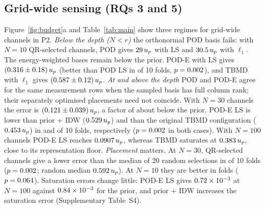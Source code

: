 \subsection{Grid-wide sensing (RQs 3 and 5)}
\label{sec:res_grid}
Figure~\ref{fig:budget}a and Table~\ref{tab:main} show three regimes for grid-wide channels in P2.
\emph{Below the depth ($N<r$)} the orthonormal POD basis fails: with $N=10$ QR-selected channels, POD gives $29\,u_p$ with LS and $30.5\,u_p$ with $\ell_1$. The energy-weighted bases remain below the prior. POD-E with LS gives $(0.316\pm0.18)\,u_p$ (better than POD LS in \WPTwoPodELsVsPodLsGridTenWins{} of 10 folds, $p=0.002$), and TBMD with $\ell_1$ gives $(0.587\pm0.12)\,u_p$.
\emph{At and above the depth} POD and POD-E agree for the same measurement rows when the sampled basis has full column rank; their separately optimised placements need not coincide. With $N=30$ channels the error is $(0.121\pm0.039)\,u_p$, a factor of about \PTwoGainPriorGridThirty{} below the prior. POD-E LS is lower than prior + IDW ($0.529\,u_p$) and than the original TBMD configuration ($0.453\,u_p$) in \WPTwoQrPodELsVsIdwGridThirtyWins{} and \WPTwoQrPodELsVsQrTbmdLGridThirtyWins{} of 10 folds, respectively ($p=0.002$ in both cases). With $N=100$ channels POD-E LS reaches $0.0907\,u_p$, whereas TBMD saturates at $0.383\,u_p$, close to its representation floor.
\emph{Placement} matters. At $N=30$, QR-selected channels give a lower error than the median of 20 random selections in \WPTwoQrPodELsVsRandomMedianGridThirtyWins{} of 10 folds ($p=0.002$; random median $0.592\,u_p$). At $N=10$ they are better in \WPTwoQrPodELsVsRandomMedianGridTenWins{} folds ($p=0.064$).
Saturation errors change little: POD-E LS gives $0.72\times10^{-3}$ at $N=100$ against $0.84\times10^{-3}$ for the prior, and prior + IDW increases the saturation error (Supplementary Table~S4).




